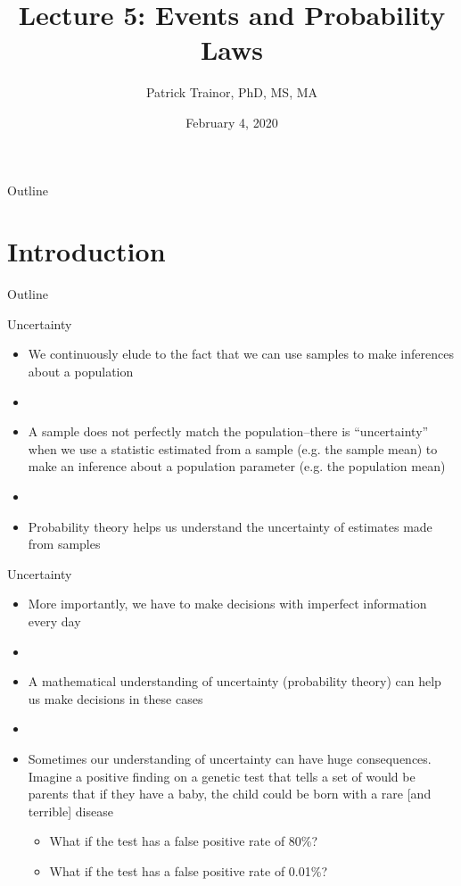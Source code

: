 \documentclass[xcolor=dvipsnames]{beamer}
\title[Lecture 5]{Lecture 5: Events and Probability Laws}
\author[Patrick Trainor]{Patrick Trainor, PhD, MS, MA}
\institute[NMSU]{New Mexico State University}
\date{February 4, 2020}
\begin{document}
\begin{frame}
\maketitle
\end{frame}

\begin{frame}{Outline}
\tableofcontents[hideallsubsections]
\end{frame}

\section{Introduction}
\begin{frame}{Outline}
	\tableofcontents[currentsection,subsectionstyle=show/shaded/hide]
\end{frame}

\begin{frame}{Uncertainty}
	\begin{itemize}
		\item We continuously elude to the fact that we can use samples to make inferences about a population \pause
		\item[]
		\item A sample does not perfectly match the population--there is ``uncertainty'' when we use a statistic estimated from a sample (e.g. the sample mean) to make an inference about a population parameter (e.g. the population mean) \pause
		\item[]
		\item Probability theory helps us understand the uncertainty of estimates made from samples
	\end{itemize}
\end{frame}

\begin{frame}{Uncertainty}
\begin{itemize}
	\item More importantly, we have to make decisions with imperfect information every day \pause
	\item[]
	\item A mathematical understanding of uncertainty (probability theory) can help us make decisions in these cases \pause
	\item[]
	\item Sometimes our understanding of uncertainty can have huge consequences. Imagine a positive finding on a genetic test that tells a set of would be parents that if they have a baby, the child could be born with a rare [and terrible] disease \pause
	\begin{itemize}
		\item What if the test has a false positive rate of 80\%? \pause
		\item What if the test has a false positive rate of 0.01\%?
	\end{itemize}
\end{itemize}
\end{frame}
\end{document}
